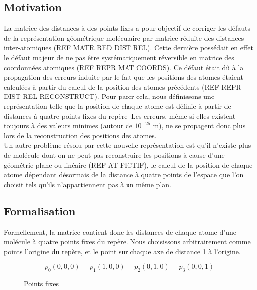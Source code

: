 
\subsection{Motivation}
\par La matrice des distances à des points fixes a pour objectif de corriger les défauts de la représentation géométrique moléculaire par matrice réduite des distances inter-atomiques (REF MATR RED DIST REL). Cette dernière possédait en effet le défaut majeur de ne pas être systématiquement réversible en matrice des coordonnées atomiques (REF REPR MAT COORDS). Ce défaut était dû à la propagation des erreurs induite par le fait que les positions des atomes étaient calculées à partir du calcul de la position des atomes précédents (REF REPR DIST REL RECONSTRUCT). Pour parer cela, nous définissons une représentation telle que la position de chaque atome est définie à partir de distances à quatre points fixes du repère. Les erreurs, même si elles existent toujours à des valeurs minimes (autour de $10^{-25}$ m), ne se propagent donc plus lors de la reconstruction des positions des atomes.\\
Un autre problème résolu par cette nouvelle représentation est qu'il n'existe plus de molécule dont on ne peut pas reconstruire les positions à cause d'une géométrie plane ou linéaire (REF AT FICTIF), le calcul de la position de chaque atome dépendant désormais de la distance à quatre points de l'espace que l'on choisit tels qu'ils n'appartiennent pas à un même plan.\\

\subsection{Formalisation}
\par Formellement, la matrice contient donc les distances de chaque atome d'une molécule à quatre points fixes du repère. Nous choisissons arbitrairement comme points l'origine du repère, et le point sur chaque axe de distance 1 à l'origine.

\begin{figure}[!h]
	
	\[
		p_0(0, 0, 0) \; \; \; \; \; 
		p_1(1, 0, 0) \; \; \; \; \; 
		p_2(0, 1, 0) \: \; \; \; \; 
		p_3(0, 0, 1)
	\]

	\caption{Points fixes}
\end{figure}

